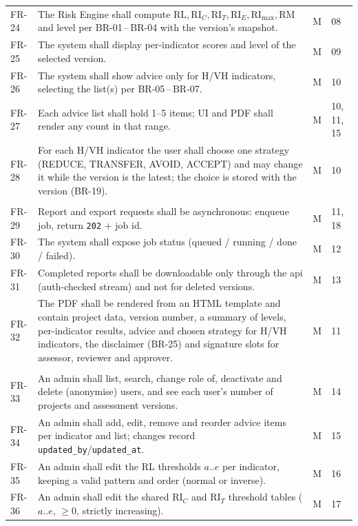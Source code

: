 \documentclass[11pt,a4paper]{article}
\newcommand{\RL}{\mathrm{RL}}
\newcommand{\RIC}{\mathrm{RI}_{C}}
\newcommand{\RIT}{\mathrm{RI}_{T}}
\newcommand{\RIE}{\mathrm{RI}_{E}}
\newcommand{\RImax}{\mathrm{RI}_{\max}}
\newcommand{\RM}{\mathrm{RM}}
\begin{document}
\begin{longtable}{@{}l R{11.2cm} c l@{}}
FR-24 & The Risk Engine shall compute $\RL,\RIC,\RIT,\RIE,\RImax,\RM$ and level per BR-01\,--\,BR-04 with the version's snapshot. & M & 08 \\
FR-25 & The system shall display per-indicator scores and level of the selected version. & M & 09 \\
FR-26 & The system shall show advice only for H/VH indicators, selecting the list(s) per BR-05\,--\,BR-07. & M & 10 \\
FR-27 & Each advice list shall hold 1--5 items; UI and PDF shall render any count in that range. & M & 10, 11, 15 \\
FR-28 & For each H/VH indicator the user shall choose one strategy (REDUCE, TRANSFER, AVOID, ACCEPT) and may change it while the version is the latest; the choice is stored with the version (BR-19). & M & 10 \\
\\
FR-29 & Report and export requests shall be asynchronous: enqueue job, return \texttt{202} + job id. & M & 11, 18 \\
FR-30 & The system shall expose job status (queued / running / done / failed). & M & 12 \\
FR-31 & Completed reports shall be downloadable only through the api (auth-checked stream) and not for deleted versions. & M & 13 \\
FR-32 & The PDF shall be rendered from an HTML template and contain project data, version number, a summary of levels, per-indicator results, advice and chosen strategy for H/VH indicators, the disclaimer (BR-25) and signature slots for assessor, reviewer and approver. & M & 11 \\
\\
FR-33 & An admin shall list, search, change role of, deactivate and delete (anonymise) users, and see each user's number of projects and assessment versions. & M & 14 \\
FR-34 & An admin shall add, edit, remove and reorder advice items per indicator and list; changes record \texttt{updated\_by}/\texttt{updated\_at}. & M & 15 \\
FR-35 & An admin shall edit the RL thresholds $a..e$ per indicator, keeping a valid pattern and order (normal or inverse). & M & 16 \\
FR-36 & An admin shall edit the shared $\RIC$ and $\RIT$ threshold tables ($a..e$, $\ge 0$, strictly increasing). & M & 17 \\

\end{longtable}
\end{document}

